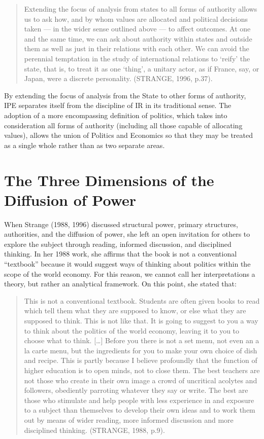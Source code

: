 \begin{quote}
Extending the focus of analysis from states to all forms of authority allows us to ask how, and by whom values are allocated and political decisions taken --- in the wider sense outlined above --- to affect outcomes. At one and the same time, we can ask about authority within states and outside them as well as just in their relations with each other. We can avoid the perennial temptation in the study of international relations to `reify' the state, that is, to treat it as one `thing', a unitary actor, as if France, say, or Japan, were a discrete personality. (STRANGE, 1996, p.37).
\end{quote}

By extending the focus of analysis from the State to other forms of authority, IPE separates itself from the discipline of IR in its traditional sense. The adoption of a more encompassing definition of politics, which takes into consideration all forms of authority (including all those capable of allocating values), allows the union of Politics and Economics so that they may be treated as a single whole rather than as two separate areas.


\section{The Three Dimensions of the Diffusion of Power}

When Strange (1988, 1996) discussed structural power, primary structures, authorities, and the diffusion of power, she left an open invitation for others to explore the subject through reading, informed discussion, and disciplined thinking. In her 1988 work, she affirms that the book is not a conventional ``textbook'' because it would suggest ways of thinking about politics within the scope of the world economy. For this reason, we cannot call her interpretations a theory, but rather an analytical framework. On this point, she stated that:

\begin{quote}
This is not a conventional textbook. Students are often given books to read which tell them what they are supposed to know, or else what they are supposed to think. This is not like that. It is going to suggest to you a way to think about the politics of the world economy, leaving it to you to choose what to think. {[}\ldots{]} Before you there is not a set menu, not even an a la carte menu, but the ingredients for you to make your own choice of dish and recipe. This is partly because I believe profoundly that the function of higher education is to open minds, not to close them. The best teachers are not those who create in their own image a crowd of uncritical acolytes and followers, obediently parroting whatever they say or write. The best are those who stimulate and help people with less experience in and exposure to a subject than themselves to develop their own ideas and to work them out by means of wider reading, more informed discussion and more disciplined thinking. (STRANGE, 1988, p.9).
\end{quote}


